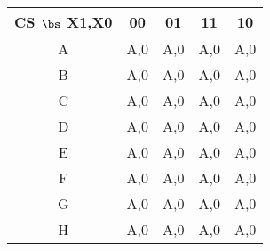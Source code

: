 \begin{enumerate}
        \begin{tabular}{c||c|c|c|c}
            CS $\bs$ X1,X0& 00    & 01    & 11    & 10    \\ \hline
            A    & A,0    & A,0    & A,0    & A,0    \\ \hline
            B    & A,0    & A,0    & A,0    & A,0    \\ \hline
            C    & A,0    & A,0    & A,0    & A,0    \\ \hline
            D    & A,0    & A,0    & A,0    & A,0    \\ \hline
            E    & A,0    & A,0    & A,0    & A,0    \\ \hline
            F    & A,0    & A,0    & A,0    & A,0    \\ \hline
            G    & A,0    & A,0    & A,0    & A,0    \\ \hline
            H    & A,0    & A,0    & A,0    & A,0    \\
        \end{tabular}

\end{enumerate}
